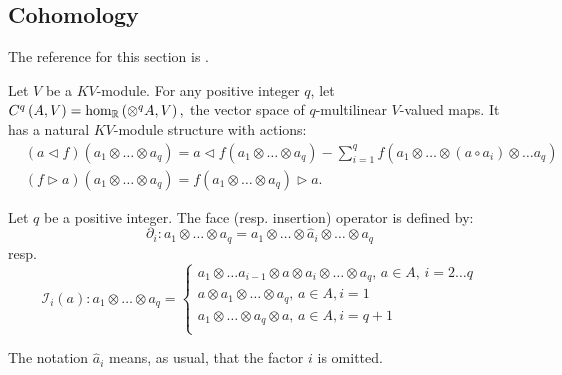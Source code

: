 \subsection{Cohomology}
The reference for this section is \cite{Boyom2002}. 
\begin{defn}
    \label{def:kv_complex}
    Let $V$ be a $KV$-module. For any positive integer $q$, let $C^q\left( A, V \right) = \hom_{\mathbb{R}}\left( \otimes^q A, V \right),$ the vector space of $q$-multilinear $V$-valued maps.
    It has a natural $KV$-module structure with actions:
    \begin{equation}
        \label{eq:kv_cq}
        \begin{split}
            & \left( a \triangleleft f \right)\left( a_1 \otimes \dots \otimes a_q \right) = a \triangleleft f\left( a_1 \otimes \dots \otimes a_q \right) - \sum_{i=1}^q f\left( 
                a_1 \otimes \dots \otimes \left(a \circ a_i\right) \otimes \dots a_q
             \right) \\
             & \left( f \triangleright a \right)\left( a_1 \otimes \dots \otimes a_q \right) = f\left( a_1 \otimes \dots \otimes a_q \right) \triangleright a.
        \end{split}
    \end{equation}
\end{defn}
\begin{defn}
\label{def:kv_face_insert}
Let $q$ be a positive integer. The face (resp. insertion) operator is defined by:
\begin{equation}
    \label{eq:kv_face}
    \partial_i \colon a_1 \otimes \dots \otimes a_q = a_1 \otimes \dots \otimes \hat{a}_i \otimes \dots \otimes a_q
\end{equation}
resp.
\begin{equation}
    \label{eq:kv_insert}
    \mathcal{I}_i(a) \colon a_1 \otimes \dots \otimes a_q = 
    \begin{cases}
        a_1 \otimes \dots  a_{i-1} \otimes a \otimes a_i \otimes \dots \otimes a_q, \, a \in A, \, i=2 \dots q\\
        a \otimes a_1 \otimes \dots \otimes a_q, \, a \in A, i=1 \\
        a_1 \otimes \dots \otimes a_q \otimes a, \, a \in A, i=q+1 \\
    \end{cases}
\end{equation}
\end{defn}
\begin{rem}
    The notation $\hat{a}_i$ means, as usual, that the factor $i$ is omitted. 
\end{rem}
